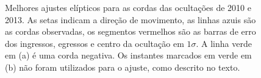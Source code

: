 \documentclass[12pt,a4paper]{report}
\newcommand{\degr}{\ensuremath{^{\circ}}}%
\newcommand{\arcmin}{\ensuremath{^{\prime}}}%
\newcommand{\fs}{\mbox{\ensuremath{.\!\!^s}}}
\newcommand{\farcs}{\mbox{\ensuremath{.\!\!^{\prime\prime}}}}%
\begin{document}
\begin{figure}
\begin{centering}
\caption{Melhores ajustes elípticos para as cordas das ocultações de 2010 e 2013. As setas indicam a direção de movimento, as linhas azuis são as cordas observadas, os segmentos vermelhos são as barras de erro dos ingressos, egressos e centro da ocultação em $1\sigma$. A linha verde em (a) é uma corda negativa. Os instantes marcados em verde em (b) não foram utilizados para o ajuste, como descrito no texto.
\label{Fig: Ceres-limb}}
\end{centering}
\end{figure}



%
%
%
%
%
\end{document}
